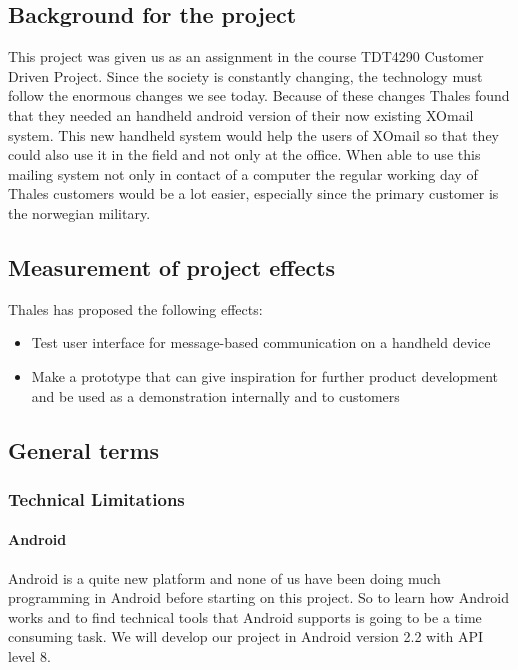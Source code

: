 \subsection{Background for the project}

This project was given us as an assignment in the course TDT4290 Customer Driven Project. Since the society is constantly changing, the technology must follow the enormous changes we see today. Because of these changes Thales found that they needed an handheld android version of their now existing XOmail system. This new handheld system would help the users of XOmail so that they could also use it in the field and not only at the office. When able to use this mailing system not only in contact of a computer the regular working day of Thales customers would be a lot easier, especially since the primary customer is the norwegian military.

\subsection{Measurement of project effects}

Thales has proposed the following effects:
\begin{itemize}
\item{}Test user interface for message-based communication on a handheld device
\item{}Make a prototype that can give inspiration for further product development and be used as a demonstration internally and to customers
\end{itemize}

\newpage
\subsection{General terms}

\subsubsection{Technical Limitations}

\paragraph{Android}
Android is a quite new platform and none of us have been doing much programming in Android before starting on this project. So to learn how Android works and to find technical tools that Android supports is going to be a time consuming task. We will develop our project in Android version 2.2 with API level 8. 


